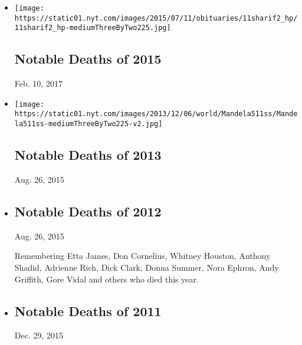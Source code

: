 \begin{itemize}
\item
  \href{https://www.nytimes.com/interactive/2015/obituaries/notable-deaths-2015.html}{}

  \texttt{[image: https://static01.nyt.com/images/2015/07/11/obituaries/11sharif2\_hp/11sharif2\_hp-mediumThreeByTwo225.jpg]}

  \hypertarget{notable-deaths-of-2015}{%
  \subsection{Notable Deaths of 2015}\label{notable-deaths-of-2015}}

  Feb. 10, 2017
\item
  \href{https://www.nytimes.com/interactive/obituaries/notable-deaths-of-2013.html}{}

  \texttt{[image: https://static01.nyt.com/images/2013/12/06/world/Mandela511ss/Mandela511ss-mediumThreeByTwo225-v2.jpg]}

  \hypertarget{notable-deaths-of-2013}{%
  \subsection{Notable Deaths of 2013}\label{notable-deaths-of-2013}}

  Aug. 26, 2015
\item
  \href{https://www.nytimes.com/interactive/obituaries/notable-deaths-of-2012.html}{}

  \hypertarget{notable-deaths-of-2012}{%
  \subsection{Notable Deaths of 2012}\label{notable-deaths-of-2012}}

  Aug. 26, 2015

  Remembering Etta James, Don Cornelius, Whitney Houston, Anthony
  Shadid, Adrienne Rich, Dick Clark, Donna Summer, Nora Ephron, Andy
  Griffith, Gore Vidal and others who died this year.
\item
  \href{https://www.nytimes.com/interactive/obituaries/2011_notabledeaths.html}{}

  \hypertarget{notable-deaths-of-2011}{%
  \subsection{Notable Deaths of 2011}\label{notable-deaths-of-2011}}

  Dec. 29, 2015


\end{itemize}
